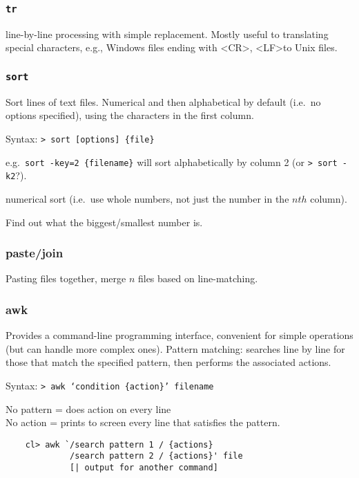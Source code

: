 \documentclass{article}
\begin{document}
\subsubsection{\texttt{tr}}
line-by-line
processing with simple replacement. Mostly useful to translating
special characters, e.g., Windows files ending with
\textless{CR}\textgreater, \textless{LF}\textgreater to Unix
files.

\subsubsection{\texttt{sort}}
Sort lines of text files.
Numerical and then alphabetical by default (i.e.\ no options
specified), using the characters in the first column.

Syntax: \texttt{> sort [options] \{file\}}
\begin{description}[labelwidth=10em]
    \item [-key=column] e.g.\ \texttt{sort -key=2 \{filename\}} will sort
        alphabetically by column 2 (or \texttt{> sort -k2}?).
    \item [-n] numerical sort (i.e.\ use whole numbers, not just the
        number in the $nth$ column).
    \item [> sort \ldots | tail -1] Find out what the biggest/smallest
        number is.
\end{description}

\subsubsection{paste/join}
Pasting files together, merge $n$ files based on line-matching.

\subsubsection{awk}
Provides a command-line programming interface, convenient for
simple operations (but can handle more complex ones).
Pattern matching: searches line by line for those that match the
specified pattern, then performs the associated actions.

Syntax: \texttt{> awk `condition \{action\}' filename}

No pattern = does action on every line\\
No action = prints to screen every line that satisfies the pattern.

\begin{lstlisting}
    cl> awk `/search pattern 1 / {actions}
             /search pattern 2 / {actions}' file
             [| output for another command]
\end{lstlisting}
\end{document}
